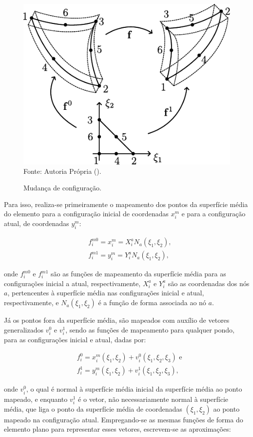 \begin{figure}[h!]
    \centering
    \caption{Mudança de configuração.}
    \includegraphics[width=.4\linewidth]{Figuras/Mapeamento.pdf}
    \\Fonte: Autoria Própria (\the\year).
    \label{fig:Mapeamento}
\end{figure}

Para isso, realiza-se primeiramente o mapeamento dos pontos da superfície média do elemento para a configuração inicial de coordenadas $x_i^m$ e para a configuração atual, de coordenadas $y_i^m$:

\begin{subequations}
    \begin{align}
         & f_i^{m0}=x_i^m=X_i^aN_a(\xi_1,\xi_2)\text{,} \\
         & f_i^{m1}=y_i^m=Y_i^aN_a(\xi_1,\xi_2)\text{,}
    \end{align}
\end{subequations}

\noindent onde $f_i^{m0}$ e $f_i^{m1}$ são as funções de mapeamento da superfície média para as configurações inicial a atual, respectivamente, $X_i^a$ e $Y_i^a$ são as coordenadas dos nós $a$, pertencentes à superfície média nas configurações inicial e atual, respectivamente, e $N_a(\xi_1,\xi_2)$ é a função de forma associada ao nó $a$.

Já os pontos fora da superfície média, são mapeados com auxílio de vetores generalizados $v_i^0$ e $v_i^1$, sendo as funções de mapeamento para qualquer pondo, para as configurações inicial e atual, dadas por:

\begin{subequations}
    \begin{align}
         & f_i^0=x_i^m(\xi_1,\xi_2)+v_i^0(\xi_1,\xi_2,\xi_3)\text{ e} \\
         & f_i^1=y_i^m(\xi_1,\xi_2)+v_i^1(\xi_1,\xi_2,\xi_3)\text{,}
    \end{align}
\end{subequations}

\noindent onde $v_i^0$, o qual é normal à superfície média inicial da superfície média ao ponto mapeado, e enquanto $v_i^1$ é o vetor, não necessariamente normal à superfície média, que liga o ponto da superfície média de coordenadas $(\xi_1,\xi_2)$ ao ponto mapeado na configuração atual. Empregando-se as mesmas funções de forma do elemento plano para representar esses vetores, escrevem-se as aproximações:

